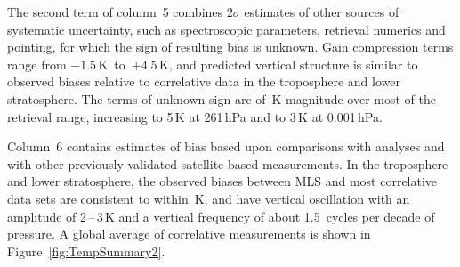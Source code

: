 \documentclass[11pt,draft]{report}
\begin{document}
The second term of column~5 combines $2\sigma$ estimates of other
sources of systematic uncertainty, such as spectroscopic parameters,
retrieval numerics and pointing, for which the sign of resulting bias is
unknown.  Gain compression terms range from $-1.5\,$K~to~$+4.5$\,K, and
predicted vertical structure is similar to observed biases relative
to correlative data in the troposphere and lower stratosphere.  The
terms of unknown sign are of \,K magnitude over most of
the retrieval range, increasing to 5\,K at 261\,hPa and to 3\,K at
0.001\,hPa.

Column~6 contains estimates of bias based upon comparisons with analyses
and with other previously-validated satellite-based measurements.  In
the troposphere and lower stratosphere, the observed biases between MLS
and most correlative data sets are consistent to within
\,K, and have vertical oscillation with an amplitude of
2\,--\,3\,K and a vertical frequency of about 1.5~cycles per decade of
pressure.  A global average of correlative measurements is shown in
Figure~\ref{fig:TempSummary2}.
\end{document}
